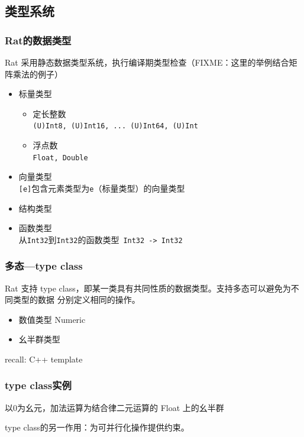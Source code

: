 \documentclass{beamer}
\begin{document}
\subsection{类型系统}

\begin{frame}
  \frametitle{Rat的数据类型}
  Rat 采用静态数据类型系统，执行编译期类型检查（FIXME：这里的举例结合矩阵乘法的例子）
  \begin{itemize}
    \item 标量类型
      \begin{itemize}
        \item 定长整数\\ \texttt{(U)Int8, (U)Int16, ... (U)Int64, (U)Int}
        \item 浮点数\\ \texttt{Float, Double}
      \end{itemize}
    \item 向量类型\\
      \texttt{[e]}包含元素类型为\texttt{e}（标量类型）的向量类型
    \item 结构类型\\
    \item 函数类型\\
      从\texttt{Int32}到\texttt{Int32}的函数类型~\texttt{Int32 -> Int32} 
  \end{itemize}
\end{frame}

\begin{frame}
  \frametitle{多态---type class}
  Rat 支持 type class，即某一类具有共同性质的数据类型。支持多态可以避免为不同类型的数据
  分别定义相同的操作。
  \begin{itemize}
    \item 数值类型 Numeric
      
    \item 幺半群类型
      
  \end{itemize}
  \pause
  recall: C++ template
  
\end{frame}

\begin{frame}
  \frametitle{type class实例}
  以0为幺元，加法运算为结合律二元运算的 Float 上的幺半群
  
  \pause
  type class的另一作用：为可并行化操作提供约束。
  
\end{frame}
\end{document}

